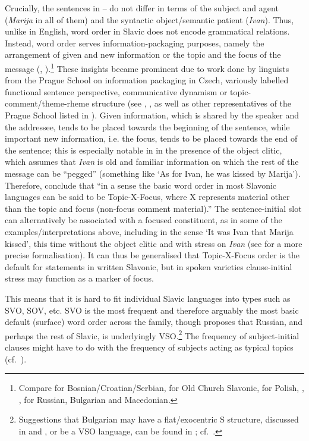 \documentclass[output=paper,hidelinks]{langscibook}
\begin{document}
Crucially, the sentences in -- do not differ in terms of the subject and agent (\textit{Marija} in all of them) and the syntactic object/semantic patient (\textit{Ivan}). Thus, unlike in English, word order in Slavic does not encode grammatical relations. Instead, word order serves information-packaging purposes, namely the arrangement of given and new information or the topic and the focus of the message (\citealt[7, 12--14]{ComrieCorbett1993}, \citealt{King95}).\footnote{Compare \citet[343--344]{Browne1993} for Bosnian/Croatian/Serbian, \citet[164--165]{Huntley1993} for Old Church Slavonic, \citet[723, 726--727]{Rothstein1993} for Polish, \citet[222, 234--235]{Scatton1993}, \citet[858--860]{Timberlake1993}, \citet[199--207, with references]{BresnanEtAl2016} for Russian, Bulgarian and Macedonian.} These insights became prominent due to work done by linguists from the Prague School on information packaging in Czech, variously labelled functional sentence perspective, communicative dynamism or topic-comment/theme-rheme structure (see \citealt{Mathesius1939,Mathesius1947}, \citealt{HajicovaParteeSgall1998}, as well as other representatives of the Prague School listed in \citealt[369--370]{DLM:LFG}). Given information, which is shared by the speaker and the addressee, tends to be placed towards the beginning of the sentence, while important new information, i.e. the focus, tends to be placed towards the end of the sentence; this is especially notable in  in the presence of the object clitic, which assumes that \textit{Ivan} is old and familiar information on which the rest of the message can be ``pegged'' (something like `As for Ivan, he was kissed by Marija'). Therefore, \citet[13]{ComrieCorbett1993} conclude that ``in a sense the basic word order in most Slavonic languages can be said to be Topic-X-Focus, where X represents material other than the topic and focus (non-focus comment material).'' The sentence-initial slot can alternatively be associated with a focused constituent, as in some of the examples/interpretations above, including  in the sense `It was Ivan that Marija kissed', this time without the object clitic and with stress on \textit{Ivan} (see  for a more precise formalisation). It can thus be generalised that Topic-X-Focus order is the default for statements in written Slavonic, but in spoken varieties clause-initial stress may function as a marker of focus.

This means that it is hard to fit individual Slavic languages into types such as SVO, SOV, etc. SVO is the most frequent and therefore arguably the most basic default (surface) word order across the family, though \citet{King95} proposes that Russian, and perhaps the rest of Slavic, is underlyingly VSO.\footnote{Suggestions that Bulgarian may have a flat/exocentric S structure, discussed in  and , or be a VSO language, can be found in \citet[120 fn. 21, 127]{King95}; cf.\ \citet{Rudin1985}.} The frequency of subject-initial clauses might have to do with the frequency of subjects acting as typical topics (cf.\ \citealt[210]{JaegerGerassimova2002}).
\end{document}
